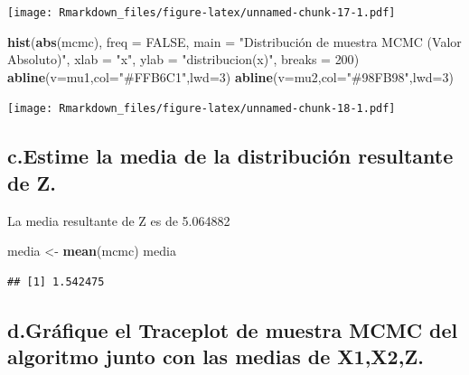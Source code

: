 \documentclass[
]{article}
\newenvironment{Shaded}{\begin{snugshade}}{\end{snugshade}}
\newcommand{\AttributeTok}[1]{\textcolor[rgb]{0.13,0.29,0.53}{#1}}
\newcommand{\ConstantTok}[1]{\textcolor[rgb]{0.56,0.35,0.01}{#1}}
\newcommand{\DecValTok}[1]{\textcolor[rgb]{0.00,0.00,0.81}{#1}}
\newcommand{\FunctionTok}[1]{\textcolor[rgb]{0.13,0.29,0.53}{\textbf{#1}}}
\newcommand{\NormalTok}[1]{#1}
\newcommand{\OtherTok}[1]{\textcolor[rgb]{0.56,0.35,0.01}{#1}}
\newcommand{\StringTok}[1]{\textcolor[rgb]{0.31,0.60,0.02}{#1}}
\begin{document}
\texttt{[image: Rmarkdown\_files/figure-latex/unnamed-chunk-17-1.pdf]}

\begin{Shaded}
\begin{Highlighting}[]
\FunctionTok{hist}\NormalTok{(}\FunctionTok{abs}\NormalTok{(mcmc), }\AttributeTok{freq =} \ConstantTok{FALSE}\NormalTok{, }
     \AttributeTok{main =} \StringTok{"Distribución de muestra MCMC (Valor Absoluto)"}\NormalTok{, }
     \AttributeTok{xlab =} \StringTok{"x"}\NormalTok{, }\AttributeTok{ylab =} \StringTok{"distribucion(x)"}\NormalTok{, }\AttributeTok{breaks =} \DecValTok{200}\NormalTok{)}
\FunctionTok{abline}\NormalTok{(}\AttributeTok{v=}\NormalTok{mu1,}\AttributeTok{col=}\StringTok{"\#FFB6C1"}\NormalTok{,}\AttributeTok{lwd=}\DecValTok{3}\NormalTok{) }
\FunctionTok{abline}\NormalTok{(}\AttributeTok{v=}\NormalTok{mu2,}\AttributeTok{col=}\StringTok{"\#98FB98"}\NormalTok{,}\AttributeTok{lwd=}\DecValTok{3}\NormalTok{)}
\end{Highlighting}
\end{Shaded}

\texttt{[image: Rmarkdown\_files/figure-latex/unnamed-chunk-18-1.pdf]}

\hypertarget{c.estime-la-media-de-la-distribuciuxf3n-resultante-de-z.}{%
\subsection{c.Estime la media de la distribución resultante de
Z.}\label{c.estime-la-media-de-la-distribuciuxf3n-resultante-de-z.}}

La media resultante de Z es de 5.064882

\begin{Shaded}
\begin{Highlighting}[]
\NormalTok{media }\OtherTok{\textless{}{-}} \FunctionTok{mean}\NormalTok{(mcmc)}
\NormalTok{media}
\end{Highlighting}
\end{Shaded}

\begin{verbatim}
## [1] 1.542475
\end{verbatim}

\hypertarget{d.gruxe1fique-el-traceplot-de-muestra-mcmc-del-algoritmo-junto-con-las-medias-de-x1x2z.}{%
\subsection{d.Gráfique el Traceplot de muestra MCMC del algoritmo junto
con las medias de
X1,X2,Z.}\label{d.gruxe1fique-el-traceplot-de-muestra-mcmc-del-algoritmo-junto-con-las-medias-de-x1x2z.}}
\end{document}
